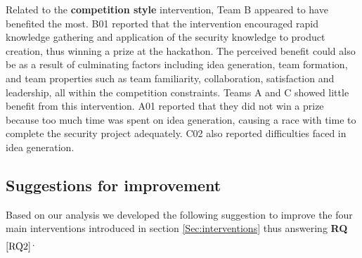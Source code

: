 \documentclass[runningheads]{llncs}
\newcommand{\hr}[1]{\textbf{RQ}$_{\ref{#1}}$}
\begin{document}
Related to the \textbf{competition style} intervention, Team B appeared to have benefited the most. B01 reported that the intervention encouraged rapid knowledge gathering and application of the security knowledge to product creation, thus winning a prize at the hackathon.
The perceived benefit could also be as a result of culminating factors including idea generation, team formation, and team properties such as team familiarity, collaboration, satisfaction and leadership, all within the competition constraints. Teams A and C showed little benefit from this intervention.
A01 reported that they did not win a prize because too much time was spent on idea generation, causing a race with time to complete the security project adequately. C02 also reported difficulties faced in idea generation.

\subsection{Suggestions for improvement}
Based on our analysis we developed the following suggestion to improve the four main interventions introduced in section \ref{Sec:interventions} thus answering \hr{RQ2}.
\end{document}

